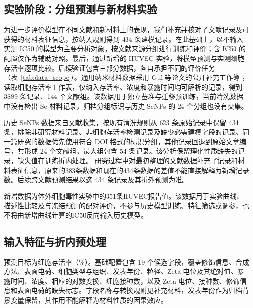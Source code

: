 \subsection{实验阶段：分组预测与新材料实验}

为进一步评价模型在不同文献和新材料上的表现，我们补充并核对了文献记录及可获得的材料表征信息，按纳入规则得到 434 条建模记录。在此基础上，以不输入实测 IC50 的模型为主要分析对象，按文献来源分组进行训练和评价；含 IC50 的配置仅作为辅助对照。最后，通过新增的 HUVEC 实验，将模型预测与实测细胞存活率逐项比较。后续验证包含三部分数据，各自承担不同的评价任务（表~\ref{tab:data_scope}）。通用纳米材料数据采用 Gul 等论文的公开补充工作簿 \cite{gul2021association}，读取细胞存活率工作表，仅纳入存活率、浓度和暴露时间均可解析的记录，得到 3889 条记录、144 个文献组。该数据用于独立基准与迁移预训练，当前清洗数据中没有检出 Se 材料记录，归档分组标识与历史 SeNPs 的 24 个分组也没有交集。

历史 SeNPs 数据来自文献收集，按现有清洗规则从 623 条原始记录中保留 434 条，排除非研究材料记录、非细胞存活率检测记录及缺少必需建模字段的记录。同一篇研究的数据优先使用符合 DOI 格式的标识分组，其他记录回退到原始文章编号，共形成 24 个文献组，最大组包含 54 条记录。该分析保留理化性质缺失的记录，缺失值在训练折内处理。
研究过程中对最初整理的文献数据补充了记录和材料表征信息，原来的383条数据和现在的434条数据的差值不能直接解释为新增记录数。后续跨文献预测结果以这 434 条记录及其折外预测为准。

新增数据为体外细胞毒性实验中的351条HUVEC报告值。该数据用于实验曲线、描述性比较及与冻结预测的配对评价，不参与历史模型训练、特征筛选或调参，也不将由新增曲线计算的IC50反向输入历史模型。

\begin{table}[H]
\centering
\caption{三部分数据的分析范围与用途。记录数不等同于独立材料数或实验重复数。}
\label{tab:data_scope}
\small

\end{table}

\subsection{输入特征与折内预处理}

预测目标为细胞存活率（\%）。基础配置包含 19 个候选字段，覆盖修饰信息、合成方法、表面电荷、细胞类型与组织、发表年份、粒径、Zeta 电位及其绝对值、暴露时间、浓度、相应的对数变换、细胞接种数，以及 Zeta 电位、接种数、修饰信息和表面电荷的缺失标志。字段名称与转换规则见补充材料，发表年份作为归档背景变量保留，其作用不能解释为材料性质的因果效应。

